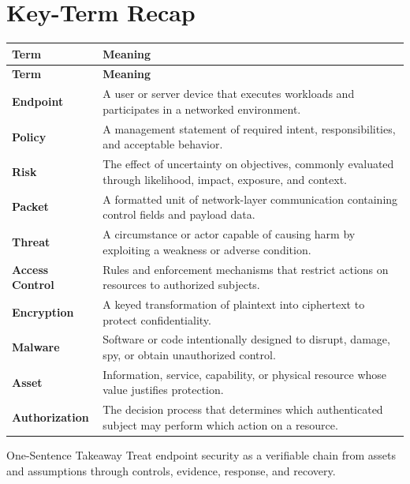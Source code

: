 \documentclass[11pt,letterpaper]{article}
\begin{document}
\section*{Key-Term Recap}
\begin{longtable}{>{\raggedright\arraybackslash}p{}>{\raggedright\arraybackslash}p{}}
\toprule\rowcolor{Navy}\color{white}\textbf{Term} & \color{white}\textbf{Meaning}\\\midrule
\endfirsthead
\toprule\rowcolor{Navy}\color{white}\textbf{Term} & \color{white}\textbf{Meaning}\\\midrule
\endhead
\textbf{Endpoint} & A user or server device that executes workloads and participates in a networked environment. \\\midrule
\textbf{Policy} & A management statement of required intent, responsibilities, and acceptable behavior. \\\midrule
\textbf{Risk} & The effect of uncertainty on objectives, commonly evaluated through likelihood, impact, exposure, and context. \\\midrule
\textbf{Packet} & A formatted unit of network-layer communication containing control fields and payload data. \\\midrule
\textbf{Threat} & A circumstance or actor capable of causing harm by exploiting a weakness or adverse condition. \\\midrule
\textbf{Access Control} & Rules and enforcement mechanisms that restrict actions on resources to authorized subjects. \\\midrule
\textbf{Encryption} & A keyed transformation of plaintext into ciphertext to protect confidentiality. \\\midrule
\textbf{Malware} & Software or code intentionally designed to disrupt, damage, spy, or obtain unauthorized control. \\\midrule
\textbf{Asset} & Information, service, capability, or physical resource whose value justifies protection. \\\midrule
\textbf{Authorization} & The decision process that determines which authenticated subject may perform which action on a resource. \\\midrule
\bottomrule
\end{longtable}
\begin{CornellExamBox}{One-Sentence Takeaway}
Treat endpoint security as a verifiable chain from assets and assumptions through controls, evidence, response, and recovery.
\end{CornellExamBox}
\end{document}
